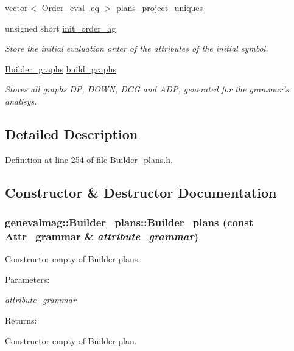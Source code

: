 \begin{CompactItemize}
vector$<$ \hyperlink{namespacegenevalmag_0bb2e8b0fa1b07b873f0363719de7b64}{Order\_\-eval\_\-eq} $>$ \hyperlink{classgenevalmag_1_1Builder__plans_6a64fd58a3ce6c2f4b6c69df14ffee6e}{plans\_\-project\_\-uniques}
\item 
unsigned short \hyperlink{classgenevalmag_1_1Builder__plans_be50c9e30276ceaeea344f6a95f23db8}{init\_\-order\_\-ag}
\begin{CompactList}\small\item\em Store the initial evaluation order of the attributes of the initial symbol. \item\end{CompactList}\item 
\hyperlink{classgenevalmag_1_1Builder__graphs}{Builder\_\-graphs} \hyperlink{classgenevalmag_1_1Builder__plans_c1d890f07dc50cc1d7383a73bb5bb5af}{build\_\-graphs}
\begin{CompactList}\small\item\em Stores all graphs DP, DOWN, DCG and ADP, generated for the grammar's analisys. \item\end{CompactList}\end{CompactItemize}


\subsection{Detailed Description}


Definition at line 254 of file Builder\_\-plans.h.

\subsection{Constructor \& Destructor Documentation}
\hypertarget{classgenevalmag_1_1Builder__plans_bd168919b4dfc51ed9c400f5afac0043}{
\subsubsection[{Builder\_\-plans}]{\setlength{\rightskip}{0pt plus 5cm}genevalmag::Builder\_\-plans::Builder\_\-plans (const {\bf Attr\_\-grammar} \& {\em attribute\_\-grammar})}}
\label{classgenevalmag_1_1Builder__plans_bd168919b4dfc51ed9c400f5afac0043}


Constructor empty of Builder plans. \begin{Desc}
\item[Parameters:]
\begin{description}
\item[{\em attribute\_\-grammar}]\end{description}
\end{Desc}
\begin{Desc}
\item[Returns:]\end{Desc}
Constructor empty of Builder plan. 

